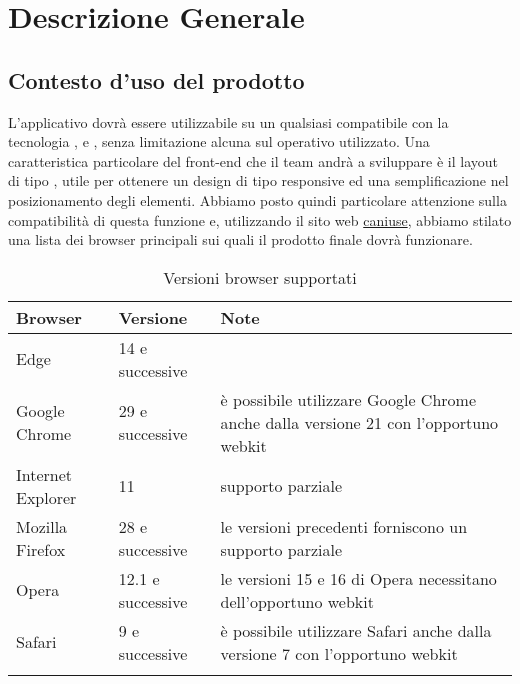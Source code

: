 \documentclass[../AnalisiDeiRequisiti_v3.0.0.tex]{subfiles}
\begin{document}
\section{Descrizione Generale}
	\subsection{Contesto d'uso del prodotto}
	L'applicativo dovrà essere utilizzabile su un qualsiasi  compatibile con la tecnologia ,  e , senza limitazione alcuna sul  operativo utilizzato.
	Una caratteristica particolare del front-end che il team andrà a sviluppare è il layout di tipo , utile per ottenere un design di tipo responsive ed una semplificazione nel posizionamento degli elementi.
	Abbiamo posto quindi particolare attenzione sulla compatibilità di questa funzione e, utilizzando il sito web \href{http://caniuse.com/#search=flexible}{caniuse}, abbiamo stilato una lista dei browser principali sui quali il prodotto finale dovrà funzionare.
 
	\vspace{0.5cm}
	\begin{longtabu} to \textwidth {
	X[3,c,m] 
	X[3,c,m]
	X[6,c,m]}
	\toprule
	\textbf{Browser} & \textbf{Versione}  & \textbf{Note} \\
	\midrule
	\endhead
	Edge & 14 e successive &  \\
	\addlinespace[0.4em]
	\midrule
	\addlinespace[0.4em]
	Google Chrome & 29 e successive & è possibile utilizzare Google Chrome anche dalla versione 21 con l'opportuno webkit \\
	\addlinespace[0.4em]
	\midrule
	\addlinespace[0.4em]	
	Internet Explorer & 11 & supporto parziale \\
	\addlinespace[0.4em]
	\midrule
	\addlinespace[0.4em]
	Mozilla Firefox & 28 e successive & le versioni precedenti forniscono un supporto parziale \\
	\addlinespace[0.4em]
	\midrule
	\addlinespace[0.4em]
	Opera & 12.1 e successive & le versioni 15 e 16 di Opera necessitano dell'opportuno webkit \\
	\addlinespace[0.4em]
	\midrule
	\addlinespace[0.4em]
	Safari & 9 e successive & è possibile utilizzare Safari anche dalla versione 7 con l'opportuno webkit \\
	\addlinespace[0.5em]
	\bottomrule
	\caption{Versioni browser supportati}
	\label{tab:browser}
	\end{longtabu}
	
\end{document}
